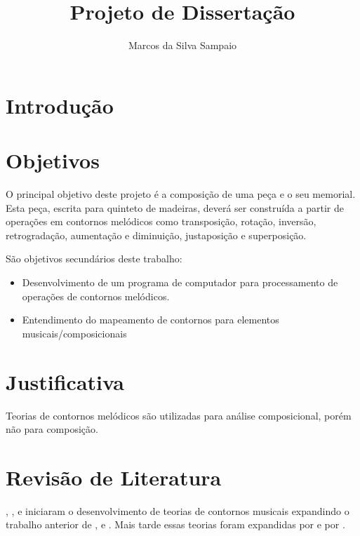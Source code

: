 \documentclass{article}
\begin{document}
\title{Projeto de Dissertação}
\author{Marcos da Silva Sampaio}
\maketitle

\thispagestyle{empty}

\setlength{\parindent}{0cm}

\section{Introdução}
\label{sec:introducao}

\section{Objetivos}
\label{sec:objetivos}

O principal objetivo deste projeto é a composição de uma peça e o seu
memorial. Esta peça, escrita para quinteto de madeiras, deverá ser
construída a partir de operações em contornos melódicos como
transposição, rotação, inversão, retrogradação, aumentação e
diminuição, justaposição e superposição.

São objetivos secundários deste trabalho:

\begin{itemize}
\item Desenvolvimento de um programa de computador para processamento
  de operações de contornos melódicos.
\item Entendimento do mapeamento de contornos para elementos
  musicais/composicionais
\end{itemize}

\section{Justificativa}
\label{sec:justificativa}


Teorias de contornos melódicos são utilizadas para análise
composicional, porém não para composição.

\section{Revisão de Literatura}
\label{sec:revis-de-liter}

\cite{friedmann85:_method_discus_contour},
\cite{morris1987cpc}, \cite{marvin87:_relat_music_contour}
e \cite{polansky92:_possib_impos_melod} iniciaram o
desenvolvimento de teorias de contornos musicais expandindo o trabalho
anterior de \cite{seeger1960mml},
\cite{kolinkski65:_struc_melod_movem} e
\cite{adams1976mct}. Mais tarde essas teorias foram expandidas
por \cite{quinn97:_fuzzy_exten_theor_contour} e por
\cite{beard2003cmm}.
\end{document}
